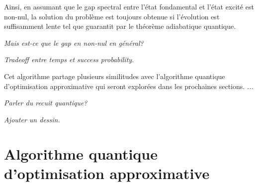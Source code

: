 Ainsi, en assumant que le gap spectral entre l'état fondamental et l'état excité est non-nul, la solution du problème est toujours obtenue si l'évolution est suffisamment lente tel que guarantit par le théorème adiabatique quantique.

\textcolor{mydarkred}{\textit{Mais est-ce que le gap en non-nul en général?}}

\textcolor{mydarkred}{\textit{Tradeoff entre temps et success probability.}}

Cet algorithme partage plusieurs similitudes avec l'algorithme quantique d'optimisation approximative qui seront explorées dans les prochaines sections. \textcolor{mydarkred}{\textit{...}}

\textcolor{mydarkred}{\textit{Parler du recuit quantique?}}

\textcolor{mydarkred}{\textit{Ajouter un dessin.}}



\section{Algorithme quantique d'optimisation approximative}

